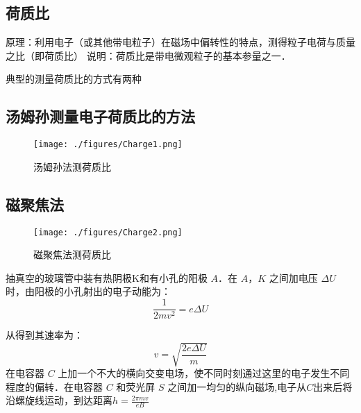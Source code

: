 
\subsection{荷质比}
原理：利用电子（或其他带电粒子）在磁场中偏转性的特点，测得粒子电荷与质量之比（即荷质比）
说明：荷质比是带电微观粒子的基本参量之一．

典型的测量荷质比的方式有两种

\subsection{汤姆孙测量电子荷质比的方法}

\begin{figure}[ht]
\centering
\texttt{[image: ./figures/Charge1.png]}
\caption{汤姆孙法测荷质比} \label{Charge_fig1}
\end{figure}

\subsection{磁聚焦法}

\begin{figure}[ht]
\centering
\texttt{[image: ./figures/Charge2.png]}
\caption{磁聚焦法测荷质比} \label{Charge_fig2}
\end{figure}

抽真空的玻璃管中装有热阴极K和有小孔的阳极 $A$．在 $A$，$K$ 之间加电压 $\Delta U$ 时，由阳极的小孔射出的电子动能为：
\begin{equation}
\frac{1}{2mv^2}=e\Delta U
\end{equation}

从得到其速率为：
\begin{equation}
v=\sqrt{\frac{2e\Delta U}{m}}
\end{equation}
在电容器 $C$ 上加一个不大的横向交变电场，使不同时刻通过这里的电子发生不同程度的偏转．在电容器 $C$ 和荧光屏 $S$ 之间加一均匀的纵向磁场,电子从$C$出来后将沿螺旋线运动，到达距离$h=\frac{2\pi mv}{eB}$

